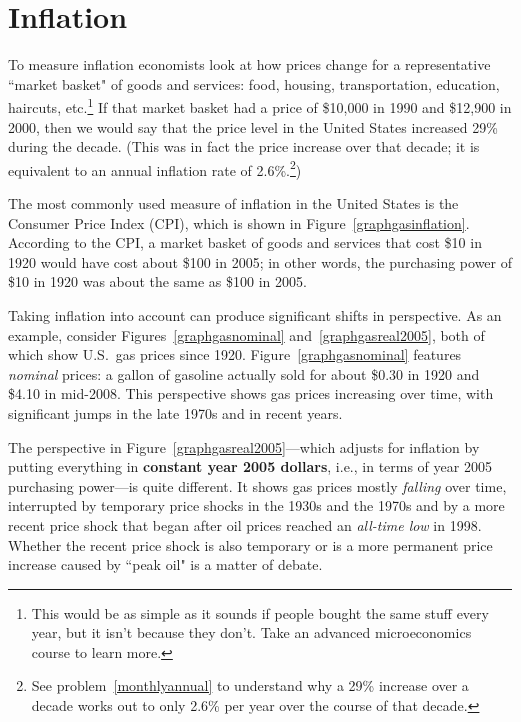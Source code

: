 \section{Inflation}

To measure inflation economists look at how prices change for a representative ``market basket" of goods and services: food, housing, transportation, education, haircuts, etc.\footnote{This would be as simple as it sounds if people bought the same stuff every year, but it isn't because they don't. Take an advanced microeconomics course to learn more.} If that market basket had a price of \$10,000 in 1990 and \$12,900 in 2000, then we would say that the price level in the United States increased 29\% during the decade. (This was in fact the price increase over that decade; it is equivalent to an annual inflation rate of 2.6\%.\footnote{See problem~\ref{monthlyannual} to understand why a 29\% increase over a decade works out to only 2.6\% per year over the course of that decade.}) %

The most commonly used measure of inflation in the United States is the Consumer Price Index (CPI), which is shown in Figure~\ref{graphgasinflation}. According to the CPI, a market basket of goods and services that cost \$10 in 1920 would have cost about \$100 in 2005; in other words, the purchasing power of \$10 in 1920 was about the same as \$100 in 2005.

Taking inflation into account can produce significant shifts in perspective. As an example, consider Figures~\ref{graphgasnominal} and~\ref{graphgasreal2005}, both of which show U.S.\ gas prices since 1920. Figure~\ref{graphgasnominal} features \emph{nominal} prices: a gallon of gasoline actually sold for about \$0.30 in 1920 and \$4.10 in mid-2008. This perspective shows gas prices increasing over time, with significant jumps in the late 1970s and in recent years.

The perspective in Figure~\ref{graphgasreal2005}---which adjusts for inflation by putting everything in \textbf{constant year 2005 dollars}, i.e., in terms of year 2005 purchasing power---is quite different. It shows gas prices mostly \emph{falling} over time, interrupted by temporary price shocks in the 1930s and the 1970s and by a more recent price shock that began after oil prices reached an \emph{all-time low} in 1998. Whether the recent price shock is also temporary or is a more permanent price increase caused by ``peak oil" is a matter of debate.




